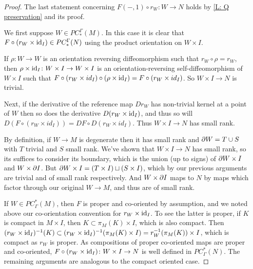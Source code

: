 \begin{proof}
	The last statement concerning $F(-,1) \circ r_W: W \to N$ holds by \cref{L: Q preservation} and its proof.

	We first suppose $W \in PC_*^\Gamma(M)$. In this case it is clear that $F \circ (r_W \times \mathrm{id}_I) \in PC_*^\Gamma(N)$ using the product orientation on $W \times I$.

	If $\rho \colon W \to W$ is an orientation reversing diffeomorphism such that $r_W \circ \rho = r_W$, then
	$\rho \times \mathrm{id}_I \colon W \times I \to W \times I$ is an orientation-reversing self-diffeomorphism of $W \times I$ such that $F\circ(r_W \times id_I) \circ (\rho \times \mathrm{id}_I) = F\circ(r_W \times id_I)$.
	So $W \times I \to N$ is trivial.

	Next, if the derivative of the reference map $Dr_W$ has non-trivial kernel at a point of $W$ then so does
	the derivative $D(r_W \times \mathrm{id}_I)$, and thus so
	will $D(F \circ (r_W \times id_I)) = DF \circ D(r_W \times id_I)$. Thus $W \times I \to N$ has small rank.

	By definition, if $W \to M$ is degenerate then it has small rank and $\partial W = T \cup S$ with $T$ trivial and $S$ small rank.
	We've shown that $W \times I \to N$ has small rank, so its suffices to consider its boundary,
	which is the union (up to signs) of $\partial W \times I$ and $W \times \partial I$. But $\partial W \times I = (T \times I) \sqcup (S \times I)$, which by our previous
	arguments are trivial and of small rank respectively. And $W \times \partial I$ maps to $N$ by maps which factor through our original $W \to M$,
	and thus are of small rank.

	If $W \in PC^*_\Gamma(M)$, then $F$ is proper and co-oriented by assumption, and we noted above our co-orientation convention for $r_W \times \mathrm{id}_I$. To see the latter is proper, if $K$ is compact in $M \times I$, then $K \subset \pi_M(K) \times I$, which is also compact. Then $(r_W \times \mathrm{id}_I)^{-1}(K) \subset (r_W \times \mathrm{id}_I)^{-1}(\pi_M(K) \times I) = r_W^{-1}(\pi_M(K)) \times I$, which is compact as $r_W$ is proper.
	As compositions of proper co-oriented maps are proper and co-oriented, $F \circ (r_W \times \mathrm{id}_I) \colon W \times I \to N$ is well defined in $PC^*_\Gamma(N)$. The remaining arguments are analogous to the compact oriented case.
\end{proof}

